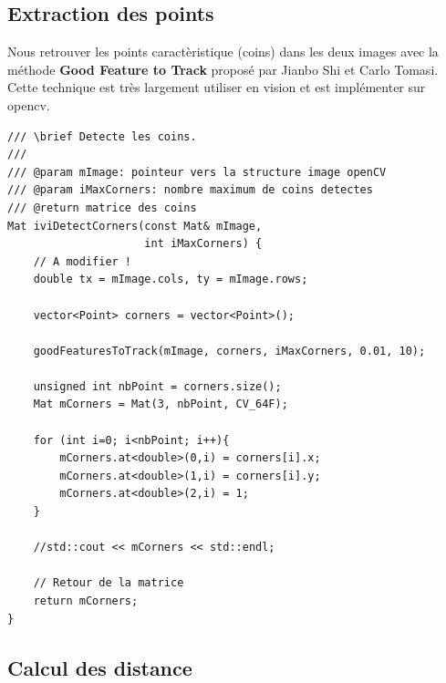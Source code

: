 \documentclass[a4paper,11pt]{article}
\begin{document}
\subsection{Extraction des points}

Nous retrouver les points caractèristique (coins) dans les deux images avec la méthode \textbf{Good Feature to Track} 
proposé par Jianbo Shi et Carlo Tomasi. Cette technique est très largement utiliser en vision et est implémenter 
sur opencv.

\begin{lstlisting}[caption=Fontion d'extraction les coins]
/// \brief Detecte les coins.
///
/// @param mImage: pointeur vers la structure image openCV
/// @param iMaxCorners: nombre maximum de coins detectes
/// @return matrice des coins
Mat iviDetectCorners(const Mat& mImage,
                     int iMaxCorners) {
    // A modifier !
    double tx = mImage.cols, ty = mImage.rows;

    vector<Point> corners = vector<Point>();

    goodFeaturesToTrack(mImage, corners, iMaxCorners, 0.01, 10);

    unsigned int nbPoint = corners.size();
    Mat mCorners = Mat(3, nbPoint, CV_64F);

    for (int i=0; i<nbPoint; i++){
        mCorners.at<double>(0,i) = corners[i].x;
        mCorners.at<double>(1,i) = corners[i].y;
        mCorners.at<double>(2,i) = 1;
    }

    //std::cout << mCorners << std::endl;

    // Retour de la matrice
    return mCorners;
}
\end{lstlisting}

\begin{figure}[H]
  \centering
\end{figure}

\subsection{Calcul des distance}
\end{document}
